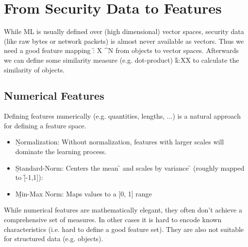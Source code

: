 \section{From Security Data to Features}

While ML is usually defined over (high dimensional) vector spaces, security data (like raw bytes or network packets) is almost never available as vectors. Thus we need a good feature mapping \f{\phi : X \rightarrow {}^N} from objects to vector spaces. Afterwards we can define some similarity measure (e.g. dot-product) \f{k:X\times X \rightarrow {}} to calculate the similarity of objects.

\subsection{Numerical Features}
Defining features numerically (e.g. quantities, lengths, ...) is a natural approach for defining a feature space.
\begin{itemize}
    \item \b{Normalization}: Without normalization, features with larger scales will dominate the learning process.
    \item \b{Standard-Norm}: Centers the mean \f{\mu} and scales by variance \f{\sigma} (roughly mapped to \f{[-1,1]}):
    \item \b{Min-Max Norm}: Maps values to a [0, 1] range
\end{itemize}

While numerical features are mathematically elegant, they often don't achieve a comprehensive set of measures. In other cases it is hard to encode known characteristics (i.e. hard to define a good feature set). They are also not suitable for structured data (e.g. objects).


